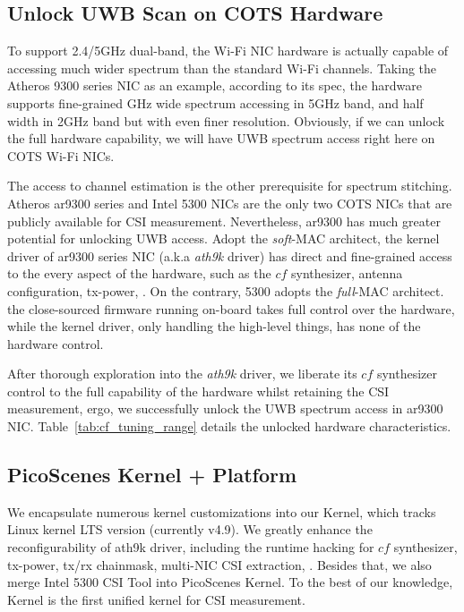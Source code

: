 
\subsection{Unlock UWB Scan on COTS Hardware} %
\label{sub:unlock_uwb_Scan_access_on_cots}


To support 2.4/5GHz dual-band,
the Wi-Fi NIC hardware is actually capable of accessing much wider spectrum than the standard Wi-Fi channels.
Taking the Atheros 9300 series NIC as an example,
according to its spec\cite{atheros_issc_papers},
the hardware supports fine-grained GHz wide spectrum accessing in 5GHz band, 
and half width in 2GHz band but with even finer resolution.
Obviously, if we can unlock the full hardware capability, 
we will have UWB spectrum access right here on COTS Wi-Fi NICs.

The access to channel estimation is the other prerequisite for spectrum stitching.
Atheros ar9300 series and Intel 5300 NICs 
are the only two COTS NICs that are publicly available for CSI measurement\cite{csitool, Xie2015Precise}.
Nevertheless, ar9300 has much greater potential for unlocking UWB access.
%
Adopt the \textit{soft}-MAC architect, 
the kernel driver of ar9300 series NIC (a.k.a \textit{ath9k} driver) 
has direct and fine-grained access to the every aspect of the hardware, 
such as the $cf$ synthesizer, antenna configuration, tx-power, \etc.
%
On the contrary, 5300 adopts the \textit{full}-MAC architect.
the close-sourced firmware running on-board takes full control over the hardware,
while the kernel driver,
only handling the high-level things,
has none of the hardware control.


After thorough exploration into the \textit{ath9k} driver, 
we liberate its $cf$ synthesizer control to the full capability of the hardware 
whilst retaining the CSI measurement,
ergo, 
we successfully unlock the UWB spectrum access in ar9300 NIC. 
Table~\ref{tab:cf_tuning_range} details the unlocked hardware characteristics. 


\subsection{PicoScenes Kernel + Platform} %
\label{sub:picoscenes_platfrom}

We encapsulate numerous kernel customizations into our \ourprotocol Kernel, which tracks Linux kernel LTS version (currently v4.9). We greatly enhance the reconfigurability of ath9k driver, including the runtime hacking for $cf$ synthesizer, tx-power, tx/rx chainmask, multi-NIC CSI extraction, \etc. Besides that, we also merge Intel 5300 CSI Tool\cite{csitool} into PicoScenes Kernel. To the best of our knowledge, \ourprotocol Kernel is the first unified kernel for CSI measurement.

